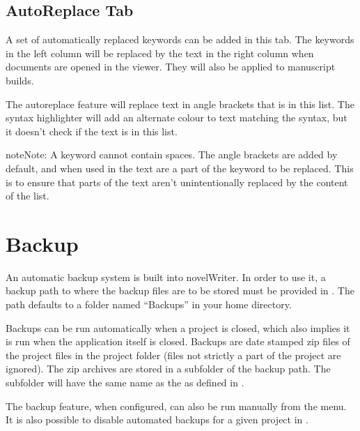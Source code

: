 \documentclass[a4paper,11pt,english]{sphinxmanual}
\begin{document}
\subsection{Auto\sphinxhyphen{}Replace Tab}
\label{\detokenize{project_overview:auto-replace-tab}}
\sphinxAtStartPar
A set of automatically replaced keywords can be added in this tab. The keywords in the left column
will be replaced by the text in the right column when documents are opened in the viewer. They will
also be applied to manuscript builds.

\sphinxAtStartPar
The auto\sphinxhyphen{}replace feature will replace text in angle brackets that is in this list. The syntax
highlighter will add an alternate colour to text matching the syntax, but it doesn’t check if the
text is in this list.

\begin{sphinxadmonition}{note}{Note:}
\sphinxAtStartPar
A keyword cannot contain spaces. The angle brackets are added by default, and when used in the
text are a part of the keyword to be replaced. This is to ensure that parts of the text aren’t
unintentionally replaced by the content of the list.
\end{sphinxadmonition}


\section{Backup}
\label{\detokenize{project_overview:backup}}\label{\detokenize{project_overview:a-proj-backup}}
\sphinxAtStartPar
An automatic backup system is built into novelWriter. In order to use it, a backup path to where
the backup files are to be stored must be provided in . The path defaults to a
folder named “Backups” in your home directory.

\sphinxAtStartPar
Backups can be run automatically when a project is closed, which also implies it is run when the
application itself is closed. Backups are date stamped zip files of the project files in the
project folder (files not strictly a part of the project are ignored). The zip archives are stored
in a subfolder of the backup path. The subfolder will have the same name as the  as
defined in {\hyperref[\detokenize{project_overview:a-proj-settings}]{}}.

\sphinxAtStartPar
The backup feature, when configured, can also be run manually from the  menu. It is also
possible to disable automated backups for a given project in .
\end{document}
